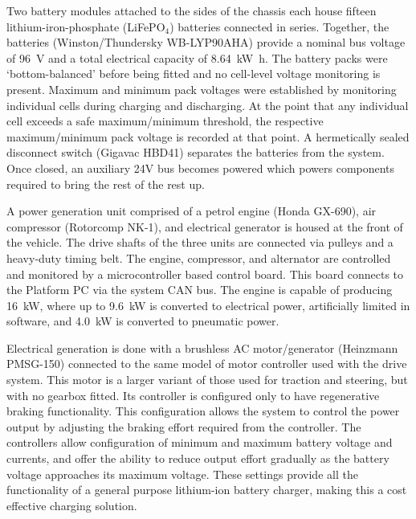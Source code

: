 \documentclass[preprint,authoryear,12pt]{elsarticle}
\begin{document}
        Two battery modules attached to the sides of the chassis each house fifteen lithium-iron-phosphate (LiFePO$_{\text{4}}$) batteries connected in series.
        Together, the batteries (Winston/Thundersky WB-LYP90AHA) provide a nominal bus voltage of \SI{96}{\volt} and a total electrical capacity of \SI{8.64}{\kilo\watt\hour}.
        The battery packs were `bottom-balanced' before being fitted and no cell-level voltage monitoring is present.
        Maximum and minimum pack voltages were established by monitoring individual cells during charging and discharging.
        At the point that any individual cell exceeds a safe maximum/minimum threshold, the respective maximum/minimum pack voltage is recorded at that point.
        A hermetically sealed disconnect switch (Gigavac HBD41) separates the batteries from the system.
        Once closed, an auxiliary 24V bus becomes powered which powers components required to bring the rest of the rest up.

        A power generation unit comprised of a petrol engine (Honda GX-690), air compressor (Rotorcomp NK-1), and electrical generator is housed at the front of the vehicle.
        The drive shafts of the three units are connected via pulleys and a heavy-duty timing belt.
        The engine, compressor, and alternator are controlled and monitored by a microcontroller based control board.
        This board connects to the Platform PC via the system CAN bus.
        The engine is capable of producing \SI{16}{\kilo\watt}, where up to \SI{9.6}{\kilo\watt} is converted to electrical power, artificially limited in software, and \SI{4.0}{\kilo\watt} is converted to pneumatic power.

        Electrical generation is done with a brushless AC motor/generator (Heinzmann PMSG-150) connected to the same model of motor controller used with the drive system.
        This motor is a larger variant of those used for traction and steering, but with no gearbox fitted.
        Its controller is configured only to have regenerative braking functionality.
        This configuration allows the system to control the power output by adjusting the braking effort required from the controller.
        The controllers allow configuration of minimum and maximum battery voltage and currents, and offer the ability to reduce output effort gradually as the battery voltage approaches its maximum voltage.
        These settings provide all the functionality of a general purpose lithium-ion battery charger, making this a cost effective charging solution.
\end{document}
